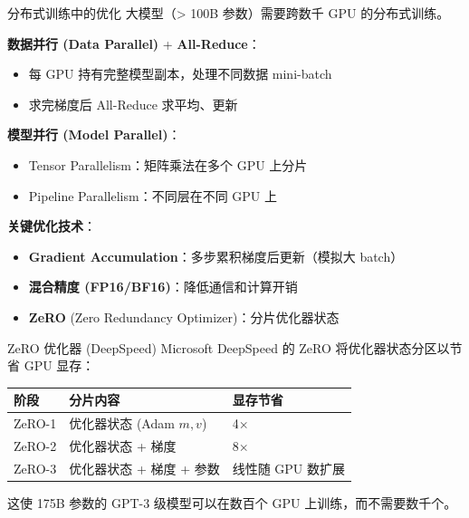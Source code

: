 \documentclass[11pt, aspectratio=169, svgnames, table, fontset=fandol]{ctexbeamer}
\begin{document}
\begin{frame}{分布式训练中的优化}
  大模型（> 100B 参数）需要跨数千 GPU 的分布式训练。

  \vspace{4pt}
  \textbf{数据并行 (Data Parallel)} + \textbf{All-Reduce}：
  \begin{itemize}
    \item 每 GPU 持有完整模型副本，处理不同数据 mini-batch
    \item 求完梯度后 All-Reduce 求平均、更新
  \end{itemize}

  \vspace{4pt}
  \textbf{模型并行 (Model Parallel)}：
  \begin{itemize}
    \item Tensor Parallelism：矩阵乘法在多个 GPU 上分片
    \item Pipeline Parallelism：不同层在不同 GPU 上
  \end{itemize}

  \vspace{4pt}
  \textbf{关键优化技术}：
  \begin{itemize}
    \item \textbf{Gradient Accumulation}：多步累积梯度后更新（模拟大 batch）
    \item \textbf{混合精度 (FP16/BF16)}：降低通信和计算开销
    \item \textbf{ZeRO} (Zero Redundancy Optimizer)：分片优化器状态
  \end{itemize}
\end{frame}

\begin{frame}{ZeRO 优化器 (DeepSpeed)}
  Microsoft DeepSpeed 的 ZeRO 将优化器状态分区以节省 GPU 显存：

  \begin{table}
    \small
    \begin{tabular}{l|p{5.5cm}|p{5cm}}
      \toprule
      阶段 & 分片内容 & 显存节省 \\
      \midrule
      ZeRO-1 & 优化器状态 (Adam $m, v$) & 4$\times$ \\
      ZeRO-2 & 优化器状态 + 梯度 & 8$\times$ \\
      ZeRO-3 & 优化器状态 + 梯度 + 参数 & 线性随 GPU 数扩展 \\
      \bottomrule
    \end{tabular}
  \end{table}

  \vspace{4pt}
  这使 175B 参数的 GPT-3 级模型可以在数百个 GPU 上训练，而不需要数千个。
\end{frame}
\end{document}
